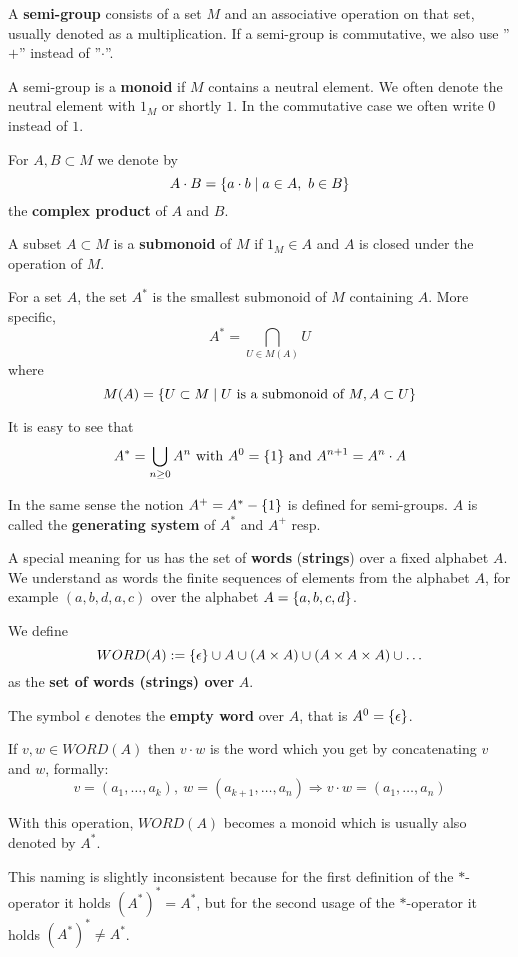 A {\bf semi-group} consists of a set $M$ and an associative operation on that
set, usually denoted as a multiplication. If a semi-group is commutative, we
also use ''$+$'' instead of ''$\cdot$''.

A semi-group is a {\bf monoid} if $M$ contains a neutral element. We often
denote the neutral element with $1_M$ or shortly $1$. In the commutative case we
often write $0$ instead of $1$.

For $A,B \subset M$ we denote by 
\[ A \cdot B = \mbox{$\{a \cdot b \mid a \in A,\ b \in B \}$}\]
the {\bf complex product} of $A$ and $B$.

A subset $A \subset M$ is a {\bf submonoid} of $M$ if $1_M \in A$ and $A$ is
closed under the operation of $M$.

For a set $A$, the set $A^*$ is the smallest submonoid of $M$ containing $A$.
More specific, 
\[ A^* = \bigcap_{U \in M(A)} U	\]
where 
\[ M(A) = \mbox{$\{U \subset M \mid U \text{ is a submonoid of } M, A \subset U \}$} \]

It is easy to see that
\[ A^* = \bigcup_{n \geq 0} A^n \text{ with }A^0 = \mbox{$\{1\}$}\text{ and }A^{n+1}= A^n \cdot A \]

In the same sense the notion $A^+ = A^* - \mbox{$\{1\}$}$ is defined for semi-groups.
$A$ is called the {\bf generating system} of $A^*$ and $A^+$ resp.

A special meaning for us has the set of {\bf words} ({\bf strings}) over
a fixed alphabet $A$. We understand as words the finite sequences of elements from
the alphabet $A$, for example $(a,b,d,a,c)$ over the alphabet $A = \mbox{$\{a,b,c,d
\}$}$.

We define
\[ WORD(A) := \mbox{$\{\epsilon\}$} \cup A \cup (A \times A) \cup (A \times A \times
A) \cup \ldots \]
as the {\bf set of words (strings) over} $A$. 

The symbol $\epsilon$ denotes the {\bf empty word} over $A$, that is $A^0 =
\mbox{$\{\epsilon\}$}$.

If $v, w \in WORD(A)$ then $v \cdot w$ is the word which you get by
concatenating $v$ and $w$, formally:
\[ v = (a_1,\ldots, a_k),\ w = (a_{k+1}, \ldots, a_n) \Rightarrow v \cdot
w = (a_1, \ldots, a_n) \]

With this operation, $WORD(A)$ becomes a monoid which is usually also denoted
by $A^*$.

This naming is slightly inconsistent because for the first definition of
the $*$-operator it holds $(A^*)^* = A^*$, but for the second usage of the
$*$-operator it holds $(A^*)^* \neq A^*$.

